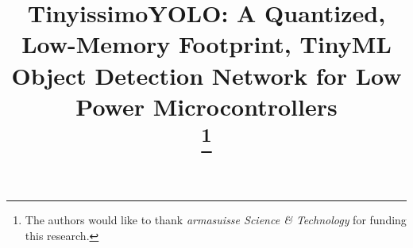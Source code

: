 \documentclass[conference]{IEEEtran}
\begin{document}
\title{TinyissimoYOLO: A Quantized, Low-Memory Footprint, TinyML Object Detection Network for Low Power Microcontrollers  \\
\thanks{The authors would like to thank \textit{armasuisse Science \& Technology} for funding this research.}
}

\author{
\IEEEauthorblockA{\textit{Center for Project Based Learning - ETH Zürich}\\
julian.moosmann, marco.giordano, christian.vogt, michele.magno@pbl.ee.ethz.ch}
}


\maketitle
\end{document}
